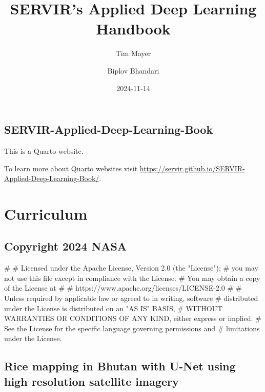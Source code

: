 \documentclass[
  letterpaper,
  DIV=11,
  numbers=noendperiod]{scrreprt}
\title{SERVIR's Applied Deep Learning Handbook}
\author{Tim Mayer \and Biplov Bhandari}
\date{2024-11-14}
\newenvironment{Shaded}{\begin{snugshade}}{\end{snugshade}}
\newcommand{\CommentTok}[1]{\textcolor[rgb]{0.37,0.37,0.37}{#1}}
\renewcommand*\contentsname{Table of contents}
\newcommand\contentsname{Table of contents}
\begin{document}
\maketitle

\renewcommand*\contentsname{Table of contents}
{
\hypersetup{linkcolor=}
\setcounter{tocdepth}{2}
\tableofcontents
}


\chapter{SERVIR-Applied-Deep-Learning-Book}\label{servir-applied-deep-learning-book}

This is a Quarto website.

To learn more about Quarto websites visit
\url{https://servir.github.io/SERVIR-Applied-Deep-Learning-Book/}.

\part{Curriculum}

\chapter{Copyright 2024 NASA}\label{copyright-2024-nasa}

\begin{Shaded}
\begin{Highlighting}[]
\CommentTok{\#}
\CommentTok{\# Licensed under the Apache License, Version 2.0 (the "License");}
\CommentTok{\# you may not use this file except in compliance with the License.}
\CommentTok{\# You may obtain a copy of the License at}
\CommentTok{\#}
\CommentTok{\#     https://www.apache.org/licenses/LICENSE{-}2.0}
\CommentTok{\#}
\CommentTok{\# Unless required by applicable law or agreed to in writing, software}
\CommentTok{\# distributed under the License is distributed on an "AS IS" BASIS,}
\CommentTok{\# WITHOUT WARRANTIES OR CONDITIONS OF ANY KIND, either express or implied.}
\CommentTok{\# See the License for the specific language governing permissions and}
\CommentTok{\# limitations under the License.}
\end{Highlighting}
\end{Shaded}

\chapter{Rice mapping in Bhutan with U-Net using high resolution
satellite
imagery}\label{rice-mapping-in-bhutan-with-u-net-using-high-resolution-satellite-imagery}
\end{document}

